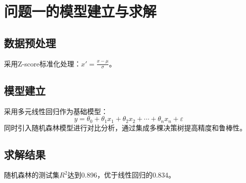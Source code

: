 \section{问题一的模型建立与求解}
\subsection{数据预处理}
采用Z-score标准化处理：$x' = \frac{x - \mu}{\sigma}$。

\subsection{模型建立}
采用多元线性回归作为基础模型：
\begin{equation}
y = \theta_0 + \theta_1 x_1 + \theta_2 x_2 + \cdots + \theta_n x_n + \varepsilon
\end{equation}
同时引入随机森林模型进行对比分析，通过集成多棵决策树提高精度和鲁棒性。

\subsection{求解结果}
随机森林的测试集$R^2$达到0.896，优于线性回归的0.834。
